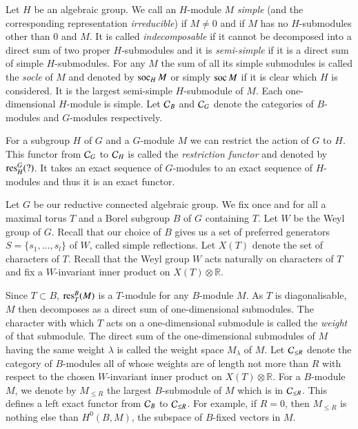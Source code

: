 \label{page10}
Let $H$ be an algebraic group. We call an $H$-module $M$ 
{\em simple}
(and the corresponding representation {\em
  irreducible}) if $M\neq 0$
and if $M$ has no $H$-submodules other than $0$ and $M$. It is called
{\em indecomposable} 
if it cannot be decomposed into a direct sum of
two proper $H$-submodules and it is {\em semi-simple} if it is a
direct sum of simple $H$-submodules. For any $M$ the sum of all its
simple submodules is called the {\em socle} of $M$ and denoted by
$\operatorname{soc}_{H}M$ or simply $\operatorname{soc} M$ if it is clear which $H$ is
considered. It is the largest semi-simple 
$H$-submodule of $M$. Each
one-dimensional $H$-module is simple. Let $\mathcal{C}_{B}$ and $\mathcal{C}_{G}$ denote
the categories of $B$-modules and $G$-modules respectively.

For a subgroup $H$ of $G$ and a $G$-module $M$ we can restrict the
action of $G$ to $H$. This functor from $\mathcal{C}_{G}$ to $\mathcal{C}_{H}$ is called
the {\em restriction functor} 
and denoted by $\operatorname{res}^{G}_{H}(?)$. It
takes an exact sequence of $G$-modules to an exact sequence of
$H$-modules and thus it is an exact functor.

Let $G$ be our reductive connected algebraic group. We fix once and
for all a maximal torus $T$ and a Borel subgroup $B$ of $G$ containing
$T$. Let $W$ be the Weyl group of $G$. Recall that our choice of $B$
gives us a set of preferred generators $S=\{s_{1},\ldots,s_{l}\}$ of
$W$, called simple reflections. Let $X(T)$ denote the set of
characters of $T$. Recall that the Weyl group $W$ acts naturally on
characters of $T$ and fix a $W$-invariant inner product on
$X(T)\otimes \mathbb{R}$.

Since $T\subset B$, $\operatorname{res}^{B}_{T}(M)$ is a $T$-module for any
$B$-module $M$. As $T$ is diagonalisable, $M$ then decomposes as a
direct sum of one-dimensional submodules. The character with which
$T$ acts on a one-dimensional submodule is called the {\em weight} of
that submodule. The direct sum of the one-dimensional submodules of
$M$ having the same weight $\lambda$ is called the weight
space 
$M_{\lambda}$ of $M$. Let $\mathcal{C}_{\leq R}$ denote the category of
$B$-modules all of whose weights are of length not more than $R$ with
respect to the chosen $W$-invariant inner product on $X(T)\otimes
\mathbb{R}$. For a $B$-module $M$, we denote by $M_{\leq R}$ the
largest $B$-submodule of $M$ which is in $\mathcal{C}_{\leq R}$. This defines a
left exact functor from $\mathcal{C}_{B}$ to $\mathcal{C}_{\leq R}$. For example, if
$R=0$, then $M_{\leq R}$ is nothing else than $H^{0}(B,M)$, the
subspace of $B$-fixed vectors in $M$.

